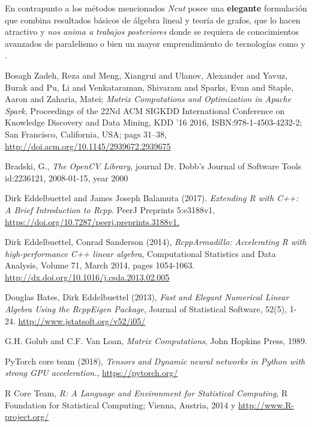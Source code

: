 \documentclass[conference]{IEEEtran}
\begin{document}
En contrapunto a los métodos mencionados \textit{Ncut} posee una \textbf{elegante} formulación que combina resultados básicos de álgebra lineal y teoría de grafos, que lo hacen atractivo y \textit{nos anima a trabajos posteriores} donde se requiera de conocimientos avanzados de paralelismo o bien un mayor emprendimiento de tecnologías como \cite{Hadoop} y \cite{MatrixSpark}.


\begin{thebibliography}{1}


Bosagh Zadeh, Reza and Meng, Xiangrui and Ulanov, Alexander and Yavuz, Burak and Pu, Li and Venkataraman, Shivaram and Sparks, Evan and Staple, Aaron and Zaharia, Matei; \textit{Matrix Computations and Optimization in Apache Spark}, Proceedings of the 22Nd ACM SIGKDD International Conference on Knowledge Discovery and Data Mining, KDD '16 2016, ISBN:978-1-4503-4232-2; San Francisco, California, USA; pags 31--38,
\url{http://doi.acm.org/10.1145/2939672.2939675}



Bradski, G., \emph{The OpenCV Library}, journal Dr. Dobb's Journal of Software Tools id:2236121, 2008-01-15, year 2000 


Dirk Eddelbuettel and James Joseph Balamuta (2017). \emph{Extending R with C++: A Brief Introduction to Rcpp}. PeerJ Preprints 5:e3188v1, \url{https://doi.org/10.7287/peerj.preprints.3188v1.}

Dirk Eddelbuettel, Conrad Sanderson (2014), \emph{RcppArmadillo: Accelerating R with high-performance C++ linear algebra}, Computational Statistics and Data Analysis, Volume 71, March 2014, pages 1054-1063. \url{  http://dx.doi.org/10.1016/j.csda.2013.02.005}

Douglas Bates, Dirk Eddelbuettel (2013), \emph{Fast and Elegant Numerical Linear Algebra Using the RcppEigen Package}, Journal of Statistical Software, 52(5), 1-24. \url{http://www.jstatsoft.org/v52/i05/}


G.H. Golub and C.F. Van Loan, \emph{Matrix Computations}, John
Hopkins Press, 1989.

PyTorch core team (2018), \emph{Tensors and Dynamic neural networks in Python with strong GPU acceleration.},  \url{https://pytorch.org/}


R Core Team, \emph{R: A Language and Environment for Statistical Computing}, R Foundation for Statistical Computing; Vienna, Austria, 2014 y  \url{http://www.R-project.org/}


\end{thebibliography}
\end{document}
